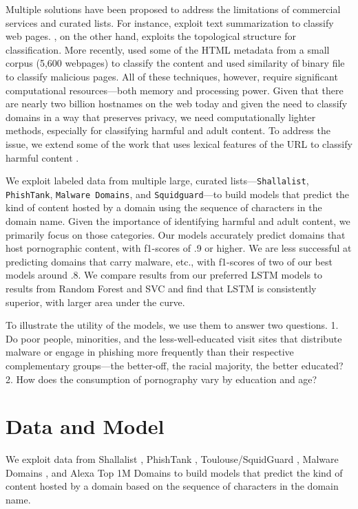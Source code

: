 \documentclass[12pt, letterpaper]{article}
\begin{document}
Multiple solutions have been proposed to address the limitations of commercial services and curated lists. For instance, \cite{shen2004web} exploit text summarization to classify web pages. \cite{zhang2010web}, on the other hand, exploits the topological structure for classification.  More recently, \cite{deri2015implementing} used some of the HTML metadata from a small corpus (5,600 webpages) to classify the content and \cite{wang2019bidirectional} used similarity of binary file to classify malicious pages. All of these techniques, however, require significant computational resources---both memory and processing power. Given that there are nearly two billion hostnames on the web today \citep{netcraft2018} and given the need to classify domains in a way that preserves privacy, we need computationally lighter methods, especially for classifying harmful and adult content. To address the issue, we extend some of the work that uses lexical features of the URL to classify harmful content \citep{aldwairi2012malurls, jain2018phish}.

We exploit labeled data from multiple large, curated lists---\texttt{Shallalist}, \texttt{PhishTank}, \texttt{Malware Domains}, and \texttt{Squidguard}---to build models that predict the kind of content hosted by a domain using the sequence of characters in the domain name. Given the importance of identifying harmful and adult content, we primarily focus on those categories. Our models accurately predict domains that host pornographic content, with f1-scores of .9 or higher. We are less successful at predicting domains that carry malware, etc., with f1-scores of two of our best models around .8. We compare results from our preferred LSTM models to results from Random Forest and SVC and find that LSTM is consistently superior, with larger area under the curve.

To illustrate the utility of the models, we use them to answer two questions. 1. Do poor people, minorities, and the less-well-educated visit sites that distribute malware or engage in phishing more frequently than their respective complementary groups---the better-off, the racial majority, the better educated? 2. How does the consumption of pornography vary by education and age?

\section{Data and Model}
We exploit data from Shallalist \citep{shalla2017}, PhishTank \citep{opendns2017}, Toulouse/SquidGuard \citep{squid2017}, Malware Domains \citep{malware2017}, and Alexa Top 1M Domains \citep{alexa2017} to build models that predict the kind of content hosted by a domain based on the sequence of characters in the domain name.
\end{document}
